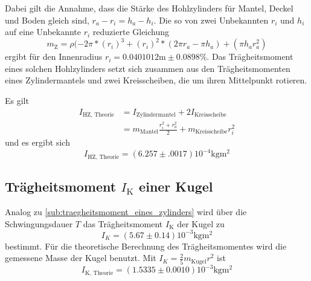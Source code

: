 Dabei gilt die Annahme, dass die Stärke des Hohlzylinders für Mantel, Deckel und Boden gleich sind, $r_a-r_i=h_a-h_i$. 
Die so von zwei Unbekannten $r_i$ und $h_i$ auf eine Unbekannte $r_i$ reduzierte Gleichung
\begin{equation}
	m_\text{Z}=\rho(-2\pi*(r_i)^3+(r_i)^2*(2\pi r_a-\pi h_a)+(\pi h_a r_a^2)
\end{equation}
ergibt für den Innenradius $r_i = 0.0401012\si{\meter}\pm0.0898\%$.
Das Trägheitsmoment eines solchen Hohlzylinders setzt sich zusammen aus den Trägheitsmomenten eines Zylindermantels und zwei Kreisscheiben, die um ihren Mittelpunkt rotieren.

Es gilt
\begin{align*}
	I_{\text{HZ, Theorie}}&=I_{\text{Zylindermantel}}+2I_{\text{Kreisscheibe}}\\
	&=m_\text{Mantel} \frac{r_i^2+r_a^2}{2}+m_\text{Kreisscheibe} r_i^2
\end{align*}
und es ergibt sich
\begin{equation}
	I_{\text{HZ, Theorie}}= (6.257\pm.0017)10^{-4} \si{\kilo\gram\meter\squared}
\end{equation}
\subsection{Trägheitsmoment $I_\text{K}$ einer Kugel}

\noindent Analog zu \ref{sub:traegheitsmoment_eines_zylinders} wird über die Schwingungsdauer $T$ das Trägheitsmoment $I_\text{K}$ der Kugel zu
\begin{equation}
	\label{wert:Kugel}
	I_K=(5.67\pm0.14)10^{-3} \si{\kilo\gram\meter\squared}
\end{equation}
bestimmt.
Für die theoretische Berechnung des Trägheitsmomentes wird die gemessene Masse der Kugel benutzt.
Mit $I_K = \frac{2}{5} m_{\text{Kugel}} r^2$ ist 
\begin{equation}
	\label{wert:Kugel}
	I_\text{K, Theorie}= (1.5335\pm0.0010)10^{-3} \si{\kilo\gram\meter\squared}
\end{equation}
